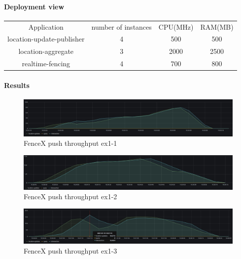 \documentclass[a4]{report}
\begin{document}
        \paragraph{Deployment view}
        \begin{center}
            \begin{tabular}{ c c c c }
                Application               & number of instances & CPU(MHz) & RAM(MB) \\
                location-update-publisher & 4                   & 500      & 500     \\
                location-aggregate        & 3                   & 2000     & 2500    \\
                realtime-fencing          & 4                   & 700      & 800     \\
            \end{tabular}
        \end{center}

        \paragraph{Results}
        \begin{figure}[ht]
            \caption{FenceX push throughput ex1-1}
            \label{fig:ex1-1}
            \includegraphics[scale=0.4]{images/evaluation/ex1-benchmarking(15,6).png}
        \end{figure}

        \begin{figure}[ht]
            \caption{FenceX push throughput ex1-2}
            \label{fig:ex1-2}
            \includegraphics[scale=0.4]{images/evaluation/ex1-benchmarking(19,7).png}
        \end{figure}

        \begin{figure}[ht]
            \caption{FenceX push throughput ex1-3}
            \label{fig:ex1-3}
            \includegraphics[scale=0.4]{images/evaluation/ex1-benchmarking(22,9).png}
        \end{figure}
\end{document}
